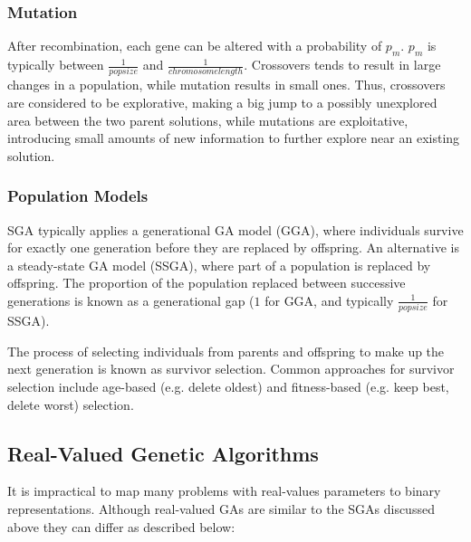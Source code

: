 \documentclass[12pt,titlepage]{article}
\begin{document}
      \subsubsection{Mutation}
        After recombination, each gene can be altered with a probability of $p_m$. $p_m$ is typically between $\frac{1}{popsize}$ and $\frac{1}{chromosomelength}$. Crossovers
        tends to result in large changes in a population, while mutation results in small ones. Thus, crossovers are considered to be explorative, making a big jump to a
        possibly unexplored area between the two parent solutions, while mutations are exploitative, introducing small amounts of new information to further explore near an
        existing solution.

      \subsubsection{Population Models}
        SGA typically applies a generational GA model (GGA), where individuals survive for exactly one generation before they are replaced by offspring. An alternative is a
        steady-state GA model (SSGA), where part of a population is replaced by offspring. The proportion of the population replaced between successive generations is known as a
        generational gap ($1$ for GGA, and typically $\frac{1}{popsize}$ for SSGA).

        The process of selecting individuals from parents and offspring to make up the next generation is known as survivor selection. Common approaches for survivor selection
        include age-based (e.g. delete oldest) and fitness-based (e.g. keep best, delete worst) selection.

    \subsection{Real-Valued Genetic Algorithms}
      It is impractical to map many problems with real-values parameters to binary representations. Although real-valued GAs are similar to the SGAs discussed above they can
      differ as described below:
\end{document}
